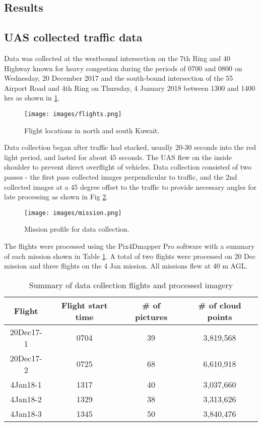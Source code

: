 \documentclass[preprint,12pt,a4paper]{elsarticle}
\begin{document}
\begin{linenumbers}
\section{Results}
\subsection{UAS collected traffic data}
Data was collected at the westbound intersection on the 7th Ring and 40 Highway known for heavy congestion during the periods of 0700 and 0800 on Wednesday, 20 December 2017 and the south-bound intersection of the 55 Airport Road and 4th Ring on Thursday, 4 January 2018 between 1300 and 1400 hrs as shown in \ref{fig:flights}. 


\begin{figure}[H]
\texttt{[image: images/flights.png]} 
\caption[Flight locations]{Flight locations in north and south Kuwait.}
\label{fig:flights}
\end{figure}

Data collection began after traffic had stacked, usually 20-30 seconds into the red light period, and lasted for about 45 seconds. The UAS flew on the inside shoulder to prevent direct overflight of vehicles. Data collection consisted of two passes - the first pass collected images perpendicular to traffic, and the 2nd collected images at a 45 degree offset to the traffic to provide necessary angles for late processing as shown in Fig \ref{fig:mission}.

\begin{figure}[H]
\texttt{[image: images/mission.png]} 
\caption{Mission profile for data collection.}
\label{fig:mission}
\end{figure}

The flights were processed using the Pix4Dmapper Pro software with a summary of each mission shown in Table \ref{tb:flightdata}. A total of two flights were processed on 20 Dec mission and three flights on the 4 Jan mission. All missions flew at 40 m AGL.

\begin{table}[H]
\centering
\caption{Summary of data collection flights and processed imagery}
\label{tb:flightdata}
\begin{tabular}{@{}cccc@{}}
\toprule
\textbf{Flight} & \textbf{Flight start time} & \textbf{\# of pictures} & \textbf{\# of cloud points} \\ \midrule
20Dec17-1 & 0704 & 39 & 3,819,568 \\
20Dec17-2 & 0725 & 68 & 6,610,918 \\
4Jan18-1 & 1317 & 40 & 3,037,660 \\
4Jan18-2 & 1329 & 38 & 3,313,626 \\
4Jan18-3 & 1345 & 50 & 3,840,476 \\ \bottomrule
\end{tabular}
\end{table}



\end{linenumbers}
\end{document}
